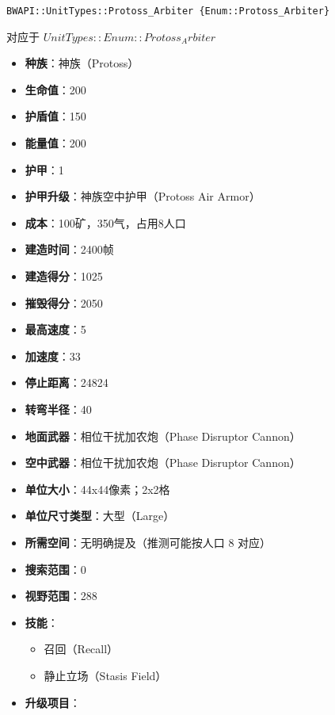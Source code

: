 \begin{tcolorbox}[colback=white, colframe=black!60!white, title=Protoss\_Arbiter(), arc=0mm]
    \begin{verbatim}
BWAPI::UnitTypes::Protoss_Arbiter {Enum::Protoss_Arbiter}
    \end{verbatim}
    对应于  $ UnitTypes::Enum::Protoss_Arbiter $ 
    \begin{itemize}
        \item \textbf{种族}：神族（Protoss）
        \item \textbf{生命值}：200
        \item \textbf{护盾值}：150
        \item \textbf{能量值}：200
        \item \textbf{护甲}：1
        \item \textbf{护甲升级}：神族空中护甲（Protoss Air Armor）
        \item \textbf{成本}：100矿，350气，占用8人口
        \item \textbf{建造时间}：2400帧
        \item \textbf{建造得分}：1025
        \item \textbf{摧毁得分}：2050
        \item \textbf{最高速度}：5
        \item \textbf{加速度}：33
        \item \textbf{停止距离}：24824
        \item \textbf{转弯半径}：40
        \item \textbf{地面武器}：相位干扰加农炮（Phase Disruptor Cannon）
        \item \textbf{空中武器}：相位干扰加农炮（Phase Disruptor Cannon）
        \item \textbf{单位大小}：44x44像素；2x2格
        \item \textbf{单位尺寸类型}：大型（Large）
        \item \textbf{所需空间}：无明确提及（推测可能按人口 8 对应）
        \item \textbf{搜索范围}：0
        \item \textbf{视野范围}：288
        \item \textbf{技能}：
            \begin{itemize}
                \item 召回（Recall）
                \item 静止立场（Stasis Field）
            \end{itemize}
        \item \textbf{升级项目}：

\end{itemize}
\end{tcolorbox}
